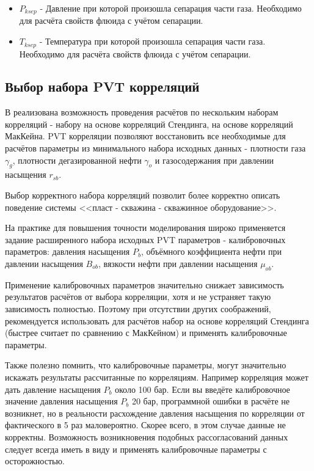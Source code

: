 \begin{itemize}
\item $P_{ksep}$ - Давление при которой произошла сепарация части газа. Необходимо для расчёта свойств флюида с учётом сепарации. 

\item $T_{ksep}$ - Температура при которой произошла сепарация части газа. Необходимо для расчёта свойств флюида с учётом сепарации. 

\end{itemize}

\subsection{Выбор набора PVT корреляций}
В \unf{} реализована возможность проведения расчётов по нескольким наборам корреляций - набору на основе корреляций Стендинга, на основе корреляций МакКейна. PVT корреляции позволяют восстановить все необходимые для расчётов параметры из минимального набора исходных данных - плотности газа $\gamma_g$, плотности дегазированной нефти $\gamma_o$ и газосодержания при давлении насыщения $r_{sb}$. 


Выбор корректного набора корреляций позволит более корректно описать поведение системы <<пласт - скважина - скважинное оборудование>>. 

На практике для повышения точности моделирования широко применяется задание расширенного набора исходных PVT параметров - калибровочных параметров: давления насыщения $P_b$, объёмного коэффициента нефти при давлении насыщения $B_{ob}$, вязкости нефти при давлении насыщения $\mu_{ob}$. 

Применение калибровочных параметров значительно снижает зависимость результатов расчётов от выбора корреляции, хотя и не устраняет такую зависимость полностью. Поэтому при отсутствии других соображений, рекомендуется использовать для расчётов набор на основе корреляций Стендинга (быстрее считает по сравнению с МакКейном) и применять калибровочные параметры.

Также полезно помнить, что калибровочные параметры, могут значительно искажать результаты рассчитанные по корреляциям. Например корреляция может дать давление насыщения $P_b$ около 100 бар. Если вы введёте калибровочное значение давления насыщения $P_b$ 20 бар, программной ошибки в расчёте не возникнет, но в реальности расхождение давления насыщения по корреляции от фактического в 5 раз маловероятно. Скорее всего, в этом случае данные не корректны. Возможность возникновения подобных рассогласований данных следует всегда иметь в виду и применять калибровочные параметры с осторожностью.  

